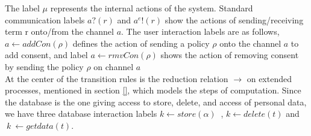 The label $ \mu$ represents the internal actions of the system. Standard communication labels  $ a? (r)$ and $ a^e !(r) $ show the actions of sending/receiving term r onto/from the channel $ a$. The user interaction labels are as follows, $ a\leftarrow addCon(\rho) $ defines the action of sending a policy $ \rho $ onto the channel $ a $ to add consent, and label $ a\leftarrow rmvCon( \rho)$ shows the action of removing consent by sending the policy $ \rho $ on channel  $ a $  \\
At the center of the transition rules is the reduction relation $ \rightarrow$ on extended processes, mentioned in section \ref{}, which models the steps of computation.  
 Since the database is the one giving access to store, delete, and access of personal data, we have three database interaction  labels $ k \leftarrow store (\alpha)  \ $ , $  k \leftarrow delete (t) $ and  $ \  k \  \leftarrow getdata (t) $. %

 
